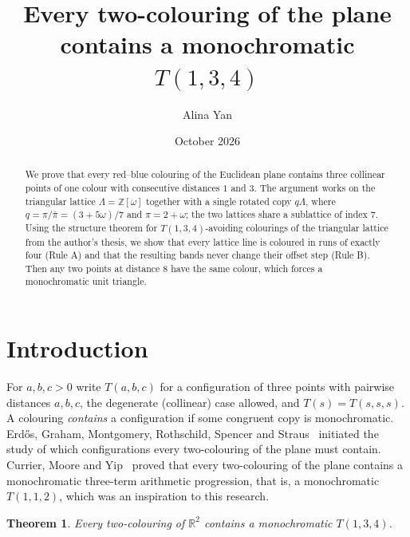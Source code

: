 \documentclass[11pt]{amsart}
\title{Every two-colouring of the plane contains a monochromatic $T(1,3,4)$}
\author{Alina Yan}\date{October 2026}
\newtheorem{theorem}{Theorem}[section]\newtheorem{lemma}[theorem]{Lemma}
\theoremstyle{definition}\newtheorem{definition}[theorem]{Definition}
\theoremstyle{remark}\newtheorem{remark}[theorem]{Remark}
\begin{document}
\begin{abstract}
We prove that every red--blue colouring of the Euclidean plane contains three collinear points of one colour
with consecutive distances $1$ and $3$. The argument works on the triangular lattice $\Lambda=\mathbb Z[\omega]$
together with a single rotated copy $q\Lambda$, where $q=\pi/\bar\pi=(3+5\omega)/7$ and $\pi=2+\omega$; the two
lattices share a sublattice of index $7$. Using the structure theorem for $T(1,3,4)$-avoiding colourings of the
triangular lattice from the author's thesis, we show that every lattice line is coloured in runs of exactly four
(Rule A) and that the resulting bands never change their offset step (Rule B). Then any two points at distance $8$
have the same colour, which forces a monochromatic unit triangle.
\end{abstract}
\maketitle

\section{Introduction}
For $a,b,c>0$ write $T(a,b,c)$ for a configuration of three points with pairwise distances $a,b,c$, the degenerate
(collinear) case allowed, and $T(s)=T(s,s,s)$. A colouring \emph{contains} a configuration if some congruent copy is
monochromatic. Erd\H{o}s, Graham, Montgomery, Rothschild, Spencer and Straus~\cite{EGMRSS} initiated the study of
which configurations every two-colouring of the plane must contain. Currier, Moore and Yip~\cite{CMY24} proved that
every two-colouring of the plane contains a monochromatic three-term arithmetic progression, that is, a
monochromatic $T(1,1,2)$, which was an inspiration to this research.

\begin{theorem}\label{thm:main}
Every two-colouring of $\mathbb R^2$ contains a monochromatic $T(1,3,4)$.
\end{theorem}
\end{document}
